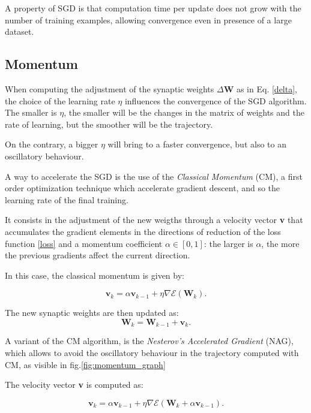 		A property of SGD is that computation time per update does not grow with the number of training examples, allowing convergence even in presence of a large dataset.

		\subsection{Momentum} %
		\label{sec:momentum}
			When computing the adjustment of the synaptic weights $\Delta\textbf{W}$ as in Eq. \ref{delta}, the choice of the learning rate $\eta$ influences the convergence of the SGD algorithm.
			The smaller is $\eta$, the smaller will be the changes in the matrix of weights and the rate of learning, but the smoother will be the trajectory.

			On the contrary, a bigger $\eta$ will bring to a faster convergence, but also to an oscillatory behaviour.

			A way to accelerate the SGD is the use of the \textit{Classical Momentum} (CM), a first order optimization technique which accelerate gradient descent, and so the learning rate of the final training.

			It consists in the adjustment of the new weigths through a velocity vector \textbf{v} that accumulates the gradient elements in the directions of reduction of the loss function \ref{loss} and a momentum coefficient $\alpha \in [0,1]$: the larger is  $\alpha$, the more the previous gradients affect the current direction.

			In this case, the classical momentum is given by:

			\begin{equation}
				\label{classical_momentum}
				\textbf{v}_k = \alpha\textbf{v}_{k-1} + \eta\nabla\mathcal{E}(\textbf{W}_k).
			\end{equation}

			The new synaptic weights are then updated as:
			\begin{equation}
				\label{update_momentum}
				\textbf{W}_k = \textbf{W}_{k-1}  + \textbf{v}_k.
			\end{equation}

			A variant of the CM algorithm, is the \textit{Nesterov's Accelerated Gradient} (NAG), which allows to avoid the oscillatory behaviour in the trajectory computed with CM, as visible in fig.\ref{fig:momentum_graph}%

			The velocity vector \textbf{v} is computed as:

			\begin{equation}
				\label{nesterov_momentum}
				\textbf{v}_k = \alpha\textbf{v}_{k-1} + \eta\nabla\mathcal{E}(\textbf{W}_k + \alpha\textbf{v}_{k-1}).
			\end{equation}
			
